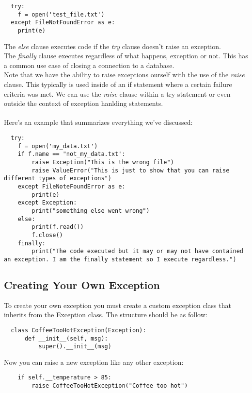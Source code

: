 \documentclass{article}%
\begin{document}
\begin{lstlisting}
  try:
    f = open('test_file.txt')
  except FileNotFoundError as e:
    print(e)
\end{lstlisting}

The \textit{else} clause executes code if the \textit{try} clause doesn't raise an exception. \\

The \textit{finally} clause executes regardless of what happens, exception or not. This has a common use case of closing a connection to a database. \\

Note that we have the ability to raise exceptions ourself with the use of the \textit{raise} clause. This typically is used inside of an if statement where a certain failure criteria was met.
We can use the \textit{raise} clause within a try statement or even outside the context of exception hanlding statements. \\ \\

Here's an example that summarizes everything we've discussed:
\begin{lstlisting}
  try:
    f = open('my_data.txt')
    if f.name == "not_my_data.txt':
        raise Exception("This is the wrong file")
        raise ValueError("This is just to show that you can raise different types of exceptions")
    except FileNoteFoundError as e:
        print(e)
    except Exception:
        print("something else went wrong")
    else:
        print(f.read())
        f.close()
    finally:
        print("The code executed but it may or may not have contained an exception. I am the finally statement so I execute regardless.")
\end{lstlisting}

\subsection{Creating Your Own Exception}
To create your own exception you must create a custom exception class that inherits from the Exception class. The structure should be as follow:
\begin{lstlisting}
  class CoffeeTooHotException(Exception):
      def __init__(self, msg):
          super().__init__(msg)
\end{lstlisting}

Now you can raise a new exception like any other exception:
\begin{lstlisting}
    if self.__temperature > 85:
        raise CoffeeTooHotException("Coffee too hot")
\end{lstlisting}
\end{document}
